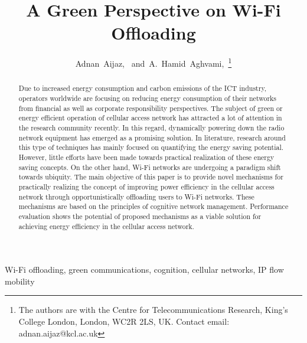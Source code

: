 \documentclass[journal]{IEEEtran}
\begin{document}
\title{A Green Perspective on Wi-Fi Offloading}




\author{Adnan~Aijaz,~
and~A.~Hamid~Aghvami,~\thanks{The authors are with the Centre for Telecommunications Research, King's College London, London, WC2R 2LS, UK. Contact email: adnan.aijaz@kcl.ac.uk}}



















\maketitle

\begin{abstract}
Due to increased energy consumption and carbon emissions of the ICT industry, operators worldwide are focusing on reducing energy consumption of their networks from financial as well as corporate responsibility perspectives. The subject of green or energy efficient operation of cellular access network has attracted a lot of attention in the research community recently. In this regard, dynamically powering down the radio network equipment has emerged as a promising solution. In literature, research around this type of techniques has mainly focused on quantifying the energy saving potential. However, little efforts have been made towards practical realization of these energy saving concepts. On the other hand, Wi-Fi networks are undergoing a paradigm shift towards ubiquity.  The main objective of this paper is to provide novel mechanisms for practically realizing the concept of improving power efficiency in the cellular access network through opportunistically offloading users to Wi-Fi networks. These mechanisms are based on the principles of cognitive network management. Performance evaluation shows the potential of proposed mechanisms as a viable solution for achieving energy efficiency in the cellular access network. 
\end{abstract}

\begin{IEEEkeywords}
Wi-Fi offloading, green communications, cognition, cellular networks, IP flow mobility
\end{IEEEkeywords}
\end{document}
